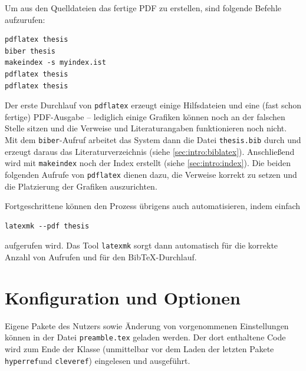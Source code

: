 Um aus den Quelldateien das fertige PDF zu erstellen, sind folgende Befehle
aufzurufen:
\begin{verbatim}
pdflatex thesis
biber thesis
makeindex -s myindex.ist
pdflatex thesis
pdflatex thesis
\end{verbatim}

Der erste Durchlauf von \texttt{pdflatex} erzeugt einige Hilfsdateien und eine
(fast schon fertige) PDF-Ausgabe -- lediglich einige Grafiken können noch an der
falschen Stelle sitzen und die Verweise und Literaturangaben funktionieren noch
nicht. Mit dem \texttt{biber}-Aufruf arbeitet das System dann die Datei
\texttt{thesis.bib} durch und erzeugt daraus das Literaturverzeichnis (siehe \cref{sec:intro:biblatex}). Anschließend wird mit \texttt{makeindex} noch der Index erstellt (siehe \cref{sec:intro:index}). Die
beiden folgenden Aufrufe von \texttt{pdflatex} dienen dazu, die Verweise korrekt
zu setzen und die Platzierung der Grafiken auszurichten. 

Fortgeschrittene können den Prozess übrigens auch automatisieren, indem einfach
\begin{verbatim}
latexmk --pdf thesis
\end{verbatim}
aufgerufen wird. Das Tool \texttt{latexmk} sorgt dann automatisch für die
korrekte Anzahl von Aufrufen und für den Bib\TeX-Durchlauf.

\section{Konfiguration und Optionen}
\label{sec:intro:optionen}
Eigene Pakete des Nutzers sowie Änderung von vorgenommenen Einstellungen können in der Datei \texttt{preamble.tex} geladen werden. Der dort enthaltene Code wird zum Ende der Klasse (unmittelbar vor dem Laden der letzten Pakete \texttt{hyperref}und \texttt{cleveref}) eingelesen und ausgeführt.

